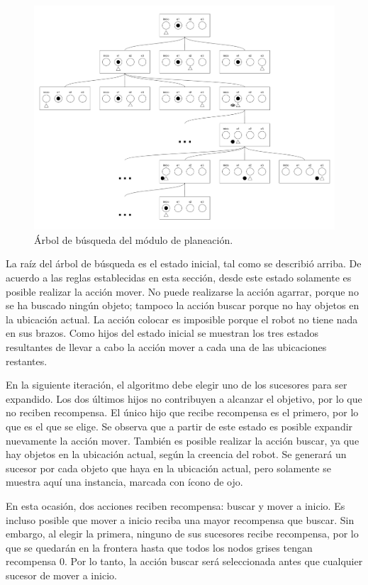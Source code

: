 \documentclass[11pt]{article}
\begin{document}
\begin{figure}
    \includegraphics [width = \textwidth] {img/ArbolPlaneacion}
    \caption{Árbol de búsqueda del módulo de planeación.}
    \label{fig:ArbolPlaneacion}
\end{figure}

La raíz del árbol de búsqueda es el estado inicial, tal como se describió arriba. De acuerdo a las reglas establecidas en esta sección, desde este estado solamente es posible realizar la acción mover. No puede realizarse la acción agarrar, porque no se ha buscado ningún objeto; tampoco la acción buscar porque no hay objetos en la ubicación actual. La acción colocar es imposible porque el robot no tiene nada en sus brazos. Como hijos del estado inicial se muestran los tres estados resultantes de llevar a cabo la acción mover a cada una de las ubicaciones restantes.

En la siguiente iteración, el algoritmo debe elegir uno de los sucesores para ser expandido. Los dos últimos hijos no contribuyen a alcanzar el objetivo, por lo que no reciben recompensa. El único hijo que recibe recompensa es el primero, por lo que es el que se elige. Se observa que a partir de este estado es posible expandir nuevamente la acción mover. También es posible realizar la acción buscar, ya que hay objetos en la ubicación actual, según la creencia del robot. Se generará un sucesor por cada objeto que haya en la ubicación actual, pero solamente se muestra aquí una instancia, marcada con ícono de ojo.

En esta ocasión, dos acciones reciben recompensa: buscar y mover a inicio. Es incluso posible que mover a inicio reciba una mayor recompensa que buscar. Sin embargo, al elegir la primera, ninguno de sus sucesores recibe recompensa, por lo que se quedarán en la frontera hasta que todos los nodos grises tengan recompensa 0. Por lo tanto, la acción buscar será seleccionada antes que cualquier sucesor de mover a inicio.
\end{document}
